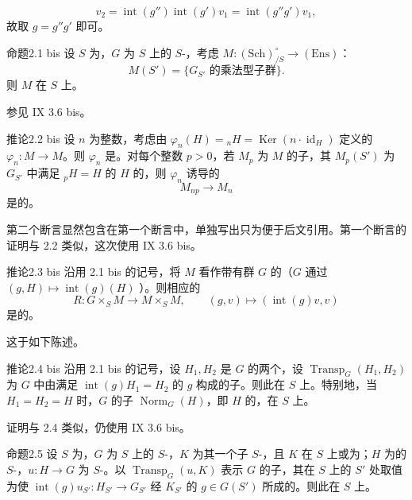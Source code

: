 \[v_2=\operatorname{int}(g'')\operatorname{int}(g')v_1=\operatorname{int}(g''g')v_1,\]
故取 $g=g''g'$ 即可。
\begin{SGAresult}{命题}{2.1 bis}
设 $S$ 为，$G$ 为 $S$ 上的 $S$-，考虑 $M:(\mathrm{Sch})^\circ_{/S}\to(\mathrm{Ens})$：
\[M(S')=\{G_{S'}\text{ 的乘法型子群}\}.\]
则 $M$ 在 $S$ 上。
\end{SGAresult}
参见 IX 3.6 bis。
\begin{SGAresult}{推论}{2.2 bis}
设 $n$ 为整数，考虑由 $\varphi_n(H)={}_nH=\operatorname{Ker}(n\cdot\operatorname{id}_H)$ 定义的 $\varphi_n:M\to M$。则 $\varphi_n$ 是。对每个整数 $p>0$，若 $M_p$ 为 $M$ 的子，其 $M_p(S')$ 为 $G_{S'}$ 中满足 ${}_pH=H$ 的 $H$ 的，则 $\varphi_n$ 诱导的
\[M_{np}\longrightarrow M_n\]
是的。
\end{SGAresult}
第二个断言显然包含在第一个断言中，单独写出只为便于后文引用。第一个断言的证明与 2.2 类似，这次使用 IX 3.6 bis。
\begin{SGAresult}{推论}{2.3 bis}
沿用 2.1 bis 的记号，将 $M$ 看作带有群 $G$ 的（$G$ 通过 $(g,H)\mapsto\operatorname{int}(g)(H)$ ）。则相应的
\[R:G\times_S M\longrightarrow M\times_S M,\qquad(g,v)\longmapsto(\operatorname{int}(g)v,v)\]
是的。
\end{SGAresult}
这于如下陈述。
\begin{SGAresult}{推论}{2.4 bis}
沿用 2.1 bis 的记号，设 $H_1,H_2$ 是 $G$ 的两个，设 $\operatorname{Transp}_G(H_1,H_2)$ 为 $G$ 中由满足 $\operatorname{int}(g)H_1=H_2$ 的 $g$ 构成的子。则此在 $S$ 上。特别地，当 $H_1=H_2=H$ 时，$G$ 的子 $\operatorname{Norm}_G(H)$，即 $H$ 的，在 $S$ 上。
\end{SGAresult}
证明与 2.4 类似，仍使用 IX 3.6 bis。
\begin{SGAresult}{命题}{2.5}
设 $S$ 为，$G$ 为 $S$ 上的 $S$-，$K$ 为其一个子 $S$-，且 $K$ 在 $S$ 上或为；$H$ 为的 $S$-，$u:H\to G$ 为 $S$-。以 $\operatorname{Transp}_G(u,K)$ 表示 $G$ 的子，其在 $S$ 上的 $S'$ 处取值为使 $\operatorname{int}(g)u_{S'}:H_{S'}\to G_{S'}$ 经 $K_{S'}$ 的 $g\in G(S')$ 所成的。则此在 $S$ 上。
\end{SGAresult}
